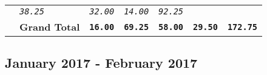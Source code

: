 \documentclass[11pt,A4paper,]{article}
\begin{document}
\begin{longtable}[]{@{}llrrrrr@{}}
\begin{minipage}[t]{0.14\columnwidth}
\end{minipage} & \begin{minipage}[t]{0.14\columnwidth}\raggedleft\strut
\emph{\texttt{38.25}}\strut
\end{minipage} & \begin{minipage}[t]{0.14\columnwidth}\raggedleft\strut
\emph{\texttt{32.00}}\strut
\end{minipage} & \begin{minipage}[t]{0.14\columnwidth}\raggedleft\strut
\emph{\texttt{14.00}}\strut
\end{minipage} & \begin{minipage}[t]{0.14\columnwidth}\raggedleft\strut
\emph{\texttt{92.25}}\strut
\end{minipage}\tabularnewline
\begin{minipage}[t]{0.14\columnwidth}\raggedright\strut
\strut
\end{minipage} & \begin{minipage}[t]{0.14\columnwidth}\raggedright\strut
\textbf{Grand Total}\strut
\end{minipage} & \begin{minipage}[t]{0.14\columnwidth}\raggedleft\strut
\textbf{\texttt{16.00}}\strut
\end{minipage} & \begin{minipage}[t]{0.14\columnwidth}\raggedleft\strut
\textbf{\texttt{69.25}}\strut
\end{minipage} & \begin{minipage}[t]{0.14\columnwidth}\raggedleft\strut
\textbf{\texttt{58.00}}\strut
\end{minipage} & \begin{minipage}[t]{0.14\columnwidth}\raggedleft\strut
\textbf{\texttt{29.50}}\strut
\end{minipage} & \begin{minipage}[t]{0.14\columnwidth}\raggedleft\strut
\textbf{\texttt{172.75}}\strut
\end{minipage}\tabularnewline
\bottomrule
\end{longtable}

\clearpage

\subsection{January 2017 - February
2017}\label{january-2017---february-2017}
\end{document}
